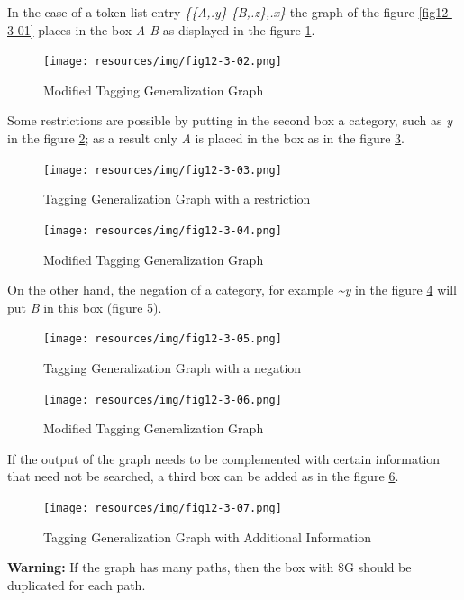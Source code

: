 In the case of a token list entry \emph{\{\{A,.y\} \{B,.z\},.x\}} the graph of the figure \ref{fig12-3-01} places in the box \textit{A B} as displayed in the figure \ref{fig12-3-02}.
\begin{figure}[!htb]
  \centering
  \texttt{[image: resources/img/fig12-3-02.png]}
  \caption{Modified Tagging Generalization Graph}
  \label{fig12-3-02}
\end{figure}

\noindent Some restrictions are possible by putting in the second box a category, such as \textit{y} in the figure \ref{fig12-3-03}; as a result only \textit{A} is placed in the box as in the figure \ref{fig12-3-04}.
\begin{figure}[!htb]
  \centering
  \texttt{[image: resources/img/fig12-3-03.png]}
  \caption{Tagging Generalization Graph with a restriction}
  \label{fig12-3-03}
\end{figure}

\begin{figure}[!htb]
  \centering
  \texttt{[image: resources/img/fig12-3-04.png]}
  \caption{Modified Tagging Generalization Graph}
  \label{fig12-3-04}
\end{figure}

\noindent On the other hand, the negation of a category, for example \textit{\textasciitilde y} in the figure \ref{fig12-3-05}  will put \textit{B} in this box (figure \ref{fig12-3-06}).
\begin{figure}[!htb]
  \centering
  \texttt{[image: resources/img/fig12-3-05.png]}
  \caption{Tagging Generalization Graph with a negation}
  \label{fig12-3-05}
\end{figure}


\begin{figure}[!htb]
  \centering
  \texttt{[image: resources/img/fig12-3-06.png]}
  \caption{Modified Tagging Generalization Graph}
  \label{fig12-3-06}
\end{figure}

If the output of the graph needs to be complemented with certain information that need not be searched, a third box can be added as in the figure \ref{fig12-3-07}.
\begin{figure}[!htb]
  \centering
  \texttt{[image: resources/img/fig12-3-07.png]}
  \caption{Tagging Generalization Graph with Additional Information}
  \label{fig12-3-07}
\end{figure}

\large{\textbf{Warning:}} If the graph has many paths, then the box with \$G should be duplicated for each path.
